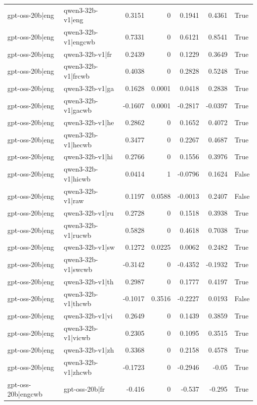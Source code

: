 \begin{table}
\begin{tabular}{l l r r r r l}
gpt-oss-20b|eng & qwen3-32b-v1|eng & 0.3151 & 0 & 0.1941 & 0.4361 & True \\
gpt-oss-20b|eng & qwen3-32b-v1|engcwb & 0.7331 & 0 & 0.6121 & 0.8541 & True \\
gpt-oss-20b|eng & qwen3-32b-v1|fr & 0.2439 & 0 & 0.1229 & 0.3649 & True \\
gpt-oss-20b|eng & qwen3-32b-v1|frcwb & 0.4038 & 0 & 0.2828 & 0.5248 & True \\
gpt-oss-20b|eng & qwen3-32b-v1|ga & 0.1628 & 0.0001 & 0.0418 & 0.2838 & True \\
gpt-oss-20b|eng & qwen3-32b-v1|gacwb & -0.1607 & 0.0001 & -0.2817 & -0.0397 & True \\
gpt-oss-20b|eng & qwen3-32b-v1|he & 0.2862 & 0 & 0.1652 & 0.4072 & True \\
gpt-oss-20b|eng & qwen3-32b-v1|hecwb & 0.3477 & 0 & 0.2267 & 0.4687 & True \\
gpt-oss-20b|eng & qwen3-32b-v1|hi & 0.2766 & 0 & 0.1556 & 0.3976 & True \\
gpt-oss-20b|eng & qwen3-32b-v1|hicwb & 0.0414 & 1 & -0.0796 & 0.1624 & False \\
gpt-oss-20b|eng & qwen3-32b-v1|raw & 0.1197 & 0.0588 & -0.0013 & 0.2407 & False \\
gpt-oss-20b|eng & qwen3-32b-v1|ru & 0.2728 & 0 & 0.1518 & 0.3938 & True \\
gpt-oss-20b|eng & qwen3-32b-v1|rucwb & 0.5828 & 0 & 0.4618 & 0.7038 & True \\
gpt-oss-20b|eng & qwen3-32b-v1|sw & 0.1272 & 0.0225 & 0.0062 & 0.2482 & True \\
gpt-oss-20b|eng & qwen3-32b-v1|swcwb & -0.3142 & 0 & -0.4352 & -0.1932 & True \\
gpt-oss-20b|eng & qwen3-32b-v1|th & 0.2987 & 0 & 0.1777 & 0.4197 & True \\
gpt-oss-20b|eng & qwen3-32b-v1|thcwb & -0.1017 & 0.3516 & -0.2227 & 0.0193 & False \\
gpt-oss-20b|eng & qwen3-32b-v1|vi & 0.2649 & 0 & 0.1439 & 0.3859 & True \\
gpt-oss-20b|eng & qwen3-32b-v1|vicwb & 0.2305 & 0 & 0.1095 & 0.3515 & True \\
gpt-oss-20b|eng & qwen3-32b-v1|zh & 0.3368 & 0 & 0.2158 & 0.4578 & True \\
gpt-oss-20b|eng & qwen3-32b-v1|zhcwb & -0.1723 & 0 & -0.2946 & -0.05 & True \\
gpt-oss-20b|engcwb & gpt-oss-20b|fr & -0.416 & 0 & -0.537 & -0.295 & True \\

\end{tabular}
\end{table}

